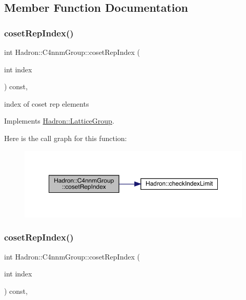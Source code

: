 \subsection{Member Function Documentation}
\mbox{\label{structHadron_1_1C4nnmGroup_a413031d9855013b22c493696c69a2c4d}} 
\subsubsection{\texorpdfstring{cosetRepIndex()}{cosetRepIndex()}\hspace{0.1cm}{\footnotesize\ttfamily [1/3]}}
{\footnotesize\ttfamily int Hadron\+::\+C4nnm\+Group\+::coset\+Rep\+Index (\begin{DoxyParamCaption}\item[{int}]{index }\end{DoxyParamCaption}) const\hspace{0.3cm}{\ttfamily [inline]}, {\ttfamily [virtual]}}

index of coset rep elements 

Implements \mbox{\hyperlink{structHadron_1_1LatticeGroup_a7e3b9b5e2f596e6c40d64aa939a3ad6c}{Hadron\+::\+Lattice\+Group}}.

Here is the call graph for this function\+:
\nopagebreak
\begin{figure}[H]
\begin{center}
\leavevmode
\includegraphics[width=350pt]{d1/dba/structHadron_1_1C4nnmGroup_a413031d9855013b22c493696c69a2c4d_cgraph}
\end{center}
\end{figure}
\mbox{\label{structHadron_1_1C4nnmGroup_a413031d9855013b22c493696c69a2c4d}} 
\subsubsection{\texorpdfstring{cosetRepIndex()}{cosetRepIndex()}\hspace{0.1cm}{\footnotesize\ttfamily [2/3]}}
{\footnotesize\ttfamily int Hadron\+::\+C4nnm\+Group\+::coset\+Rep\+Index (\begin{DoxyParamCaption}\item[{int}]{index }\end{DoxyParamCaption}) const\hspace{0.3cm}{\ttfamily [inline]}, {\ttfamily [virtual]}}

